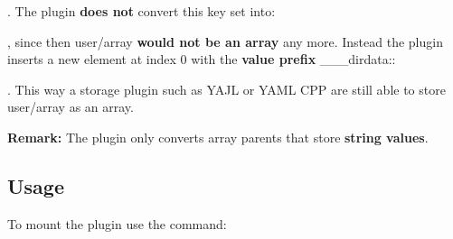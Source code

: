 \begin{DoxyCode}{0}
\end{DoxyCode}


. The plugin {\bfseries{does not}} convert this key set into\+:


\begin{DoxyCode}{0}
\end{DoxyCode}


, since then {\ttfamily user/array} {\bfseries{would not be an array}} any more. Instead the plugin inserts a new element at index 0 with the {\bfseries{value prefix}} {\ttfamily \+\_\+\+\_\+\+\_\+dirdata\+:}\+:


\begin{DoxyCode}{0}
\end{DoxyCode}


. This way a storage plugin such as Y\+A\+JL or Y\+A\+ML C\+PP are still able to store {\ttfamily user/array} as an array.

{\bfseries{Remark\+:}} The plugin only converts array parents that store {\bfseries{string values}}.\hypertarget{autotoc_md181_autotoc_md184}{}\subsection{Usage}\label{autotoc_md181_autotoc_md184}
To mount the plugin use the command\+:

